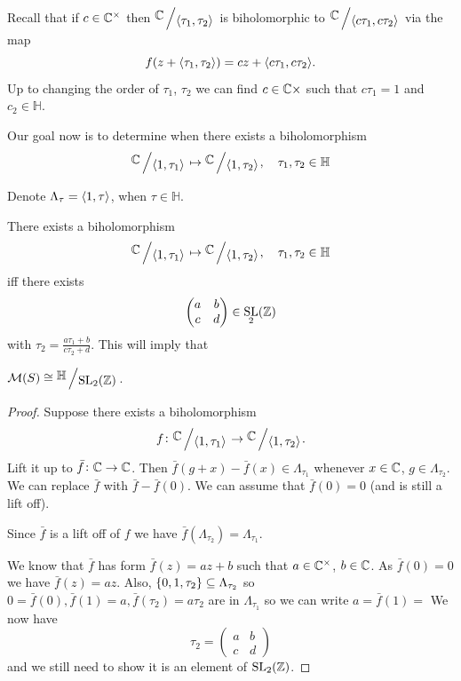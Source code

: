 \documentclass[11pt,a4paper]{article}
\renewcommand{\H}{\mathbb H}
\DeclareMathOperator{\SL}{SL}
\begin{document}
Recall that if $c \in \mathbb{C}^{\times}$ then $\bigslant{\C}{\ip{\tau_1}{\tau_2}}$
is biholomorphic to $\bigslant{\C}{\ip{c \tau_1}{c \tau_2}}$ via the map
\[
  f(z + \langle \tau_1, \tau_2 \rangle) = cz + \langle c \tau_1, c \tau_2 \rangle.
\]
Up to changing the order of $\tau_1$, $\tau_2$ we can find $c \in \mathbb{C}{\times}$
such that $c \tau_1 = 1$ and $c_2 \in \H$.

Our goal now is to determine when there exists a biholomorphism
\[
  \bigslant{\C}{\ip{1}{\tau_1}} \mapsto
  \bigslant{\C}{\ip{1}{\tau_2}}, \quad \tau_1,\tau_2 \in \H
\]

Denote $\Lambda_{\tau} = \langle 1, \tau \rangle$, when $\tau \in \H$.

\begin{theorem}
There exists a biholomorphism
\[
  \bigslant{\C}{\ip{1}{\tau_1}} \mapsto
  \bigslant{\C}{\ip{1}{\tau_2}}, \quad \tau_1,\tau_2 \in \H
\]
iff there exists 
\[
  \begin{pmatrix}
    a & b \\
    c & d
  \end{pmatrix} \in \SL_2(\Z)
\]
with $\tau_2= \frac{a \tau_1 + b}{c \tau_2 + d}$.
This will imply that \item $\M(S) \cong \bigslant{\H}{\SL_2(\Z)}$.
\end{theorem}
\begin{proof}
  Suppose there exists a biholomorphism 
  \[
    f \colon \bigslant{\C}{\ip{1}{\tau_1}} \to
    \bigslant{\C}{\ip{1}{\tau_2}}.
  \]
  Lift it up to $\bar f \colon \mathbb{C} \to \mathbb{C}$.
  Then $\bar f(g + x) - \bar f(x) \in \Lambda_{\tau_1}$
  whenever $x \in \mathbb{C}$, $g \in \Lambda_{\tau_2}$.
  We can replace $\bar f$ with $\bar f - \bar f(0)$.
  We can assume that $\bar f(0) = 0$ (and is still a lift off).
  \begin{remark}
    Since $\bar f$ is a lift off of $f$ we have 
    $\bar f(\Lambda_{\tau_2}) = \Lambda_{\tau_1}$.
  \end{remark}
  We know that $\bar f$ has form $\bar f(z) = a z + b$ such that
  $a \in \mathbb{C}^{\times}$, $b \in \mathbb{C}$.
  As $\bar f(0) = 0$ we have $\bar f(z) = a z$.
  Also, $\set{0,1,\tau_2} \subseteq \Lambda_{\tau_2}$ so 
  $0 = \bar f(0), \bar f(1) = a, \bar f(\tau_2) = a \tau_2$ are in
  $\Lambda_{\tau_1}$ so we can write $a = \bar f(1) = $
  We now have
  \[
    \tau_2 =
    \begin{pmatrix}
      a & b \\
      c & d
    \end{pmatrix}
  \]
  and we still need to show it is an element of $\SL_2(\Z)$.
\end{proof}
\end{document}
